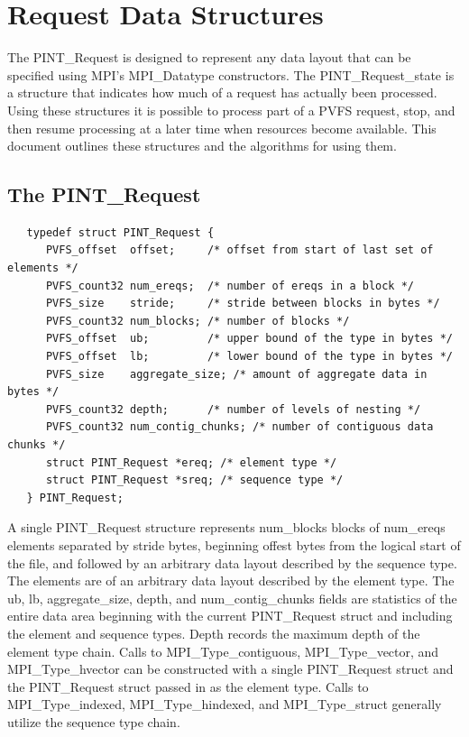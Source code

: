 \documentclass[12pt]{article} %
\begin{document}
\section{Request Data Structures}

The PINT\_Request is designed to represent any data layout that can
be specified using MPI's MPI\_Datatype constructors.  The
PINT\_Request\_state is a structure that indicates how much of a request
has actually been processed.  Using these structures it is possible to
process part of a PVFS request, stop, and then resume processing at a
later time when resources become available.  This document outlines
these structures and the algorithms for using them.

\subsection*{The PINT\_Request}

\begin{verbatim}
   typedef struct PINT_Request {
      PVFS_offset  offset;     /* offset from start of last set of elements */
      PVFS_count32 num_ereqs;  /* number of ereqs in a block */
      PVFS_size    stride;     /* stride between blocks in bytes */
      PVFS_count32 num_blocks; /* number of blocks */
      PVFS_offset  ub;         /* upper bound of the type in bytes */
      PVFS_offset  lb;         /* lower bound of the type in bytes */
      PVFS_size    aggregate_size; /* amount of aggregate data in bytes */
      PVFS_count32 depth;      /* number of levels of nesting */
      PVFS_count32 num_contig_chunks; /* number of contiguous data chunks */
      struct PINT_Request *ereq; /* element type */
      struct PINT_Request *sreq; /* sequence type */
   } PINT_Request;
\end{verbatim}

A single PINT\_Request structure represents num\_blocks blocks of
num\_ereqs
elements separated by stride bytes, beginning offest bytes from the
logical start of the file, and followed by an arbitrary data layout
described by the sequence type.  The elements are of an arbitrary
data layout described by the element type.  The ub, lb,
aggregate\_size, depth, and num\_contig\_chunks fields are
statistics of the entire data area beginning with the
current PINT\_Request struct and including the element and sequence
types.  Depth records the maximum depth of the element type chain.
Calls to MPI\_Type\_contiguous, MPI\_Type\_vector, and
MPI\_Type\_hvector can be constructed
with a single PINT\_Request struct and the PINT\_Request struct passed
in as the element type.  Calls to MPI\_Type\_indexed,
MPI\_Type\_hindexed, and MPI\_Type\_struct generally utilize the
sequence type chain.
\end{document}
